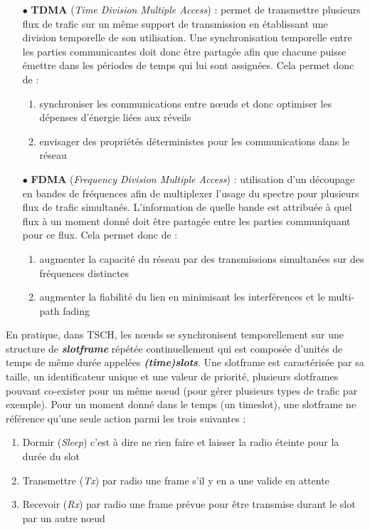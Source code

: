 \documentclass[]{report}
\begin{document}
\begin{itemize}
\item[$\bullet$] \textbf{TDMA} (\textit{Time Division Multiple Access}) : permet de transmettre plusieurs flux de trafic sur un même support de transmission en établissant une division temporelle de son utilisation. Une synchronisation temporelle entre les parties communicantes doit donc être partagée afin que chacune puisse émettre dans les périodes de temps qui lui sont assignées. Cela permet donc de \cite{ietf-6tisch-architecture-28} :
\begin{enumerate}
\item synchroniser les communications entre nœuds et donc optimiser les dépenses d'énergie liées aux réveils
\item envisager des propriétés déterministes pour les communications dans le réseau
\end{enumerate}
\vspace{0.2cm}
\item[$\bullet$] \textbf{FDMA} (\textit{Frequency Division Multiple Access}) : utilisation d'un découpage en bandes de fréquences afin de multiplexer l'usage du spectre pour plusieurs flux de trafic simultanés. L'information de quelle bande est attribuée à quel flux à un moment donné doit être partagée entre les parties communiquant pour ce flux. Cela permet donc de :
\begin{enumerate}
\item augmenter la capacité du réseau par des transmissions simultanées sur des fréquences distinctes
\item augmenter la fiabilité du lien en minimisant les interférences et le multi-path fading \cite{rfc7554} 
\end{enumerate}
\end{itemize}

\vspace{0.1cm}

\par En pratique, dans TSCH, les nœuds se synchronisent temporellement sur une structure de \textbf{\textit{slotframe}} répétée continuellement qui est composée d'unités de temps de même durée appelées \textbf{\textit{(time)slots}}. Une slotframe est caractérisée par sa taille, un identificateur unique et une valeur de priorité, plusieurs slotframes pouvant co-exister pour un même nœud (pour gérer plusieurs types de trafic par exemple). Pour un moment donné dans le temps (un timeslot), une slotframe ne référence qu'une seule action parmi les trois suivantes :
\vspace{0.1cm}
\begin{enumerate}
\item Dormir (\textit{Sleep}) c'est à dire ne rien faire et laisser la radio éteinte pour la durée du slot
\item Transmettre (\textit{Tx}) par radio une frame s'il y en a une valide en attente
\item Recevoir (\textit{Rx}) par radio une frame prévue pour être transmise durant le slot par un autre nœud
\end{enumerate}
\vspace{0.1cm}
\end{document}
